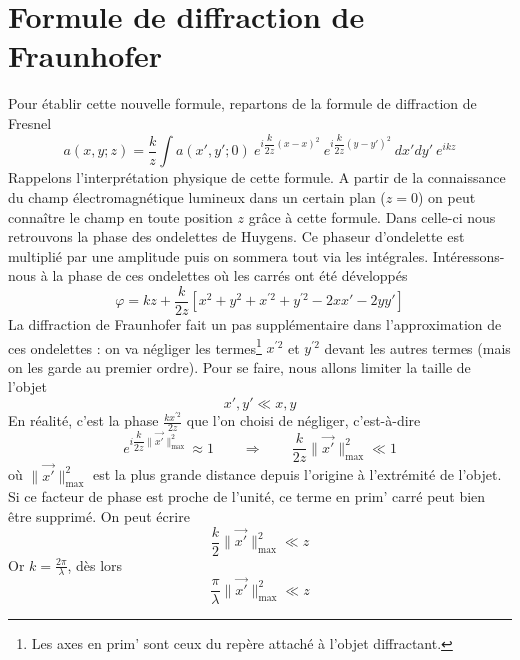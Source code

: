 \newpage
\section{Formule de diffraction de Fraunhofer}
Pour établir cette nouvelle formule, repartons de la formule de diffraction de Fresnel
\begin{equation}
a(x,y;z) = \frac{k}{z}\int a(x',y';0)\ e^{i\dfrac{k}{2z}(x-x)^2}\
 e^{i\dfrac{k}{2z}(y-y')^2}\ dx'dy'\  e^{ikz}
\end{equation}
Rappelons l'interprétation physique de cette formule.
A partir de la connaissance du champ électromagnétique lumineux dans un certain plan 
($z=0$) on peut connaître le champ en toute position $z$ grâce à cette formule. Dans 
celle-ci nous retrouvons la phase des ondelettes de Huygens. Ce phaseur d'ondelette 
est multiplié par une amplitude puis on sommera tout via les intégrales. Intéressons-
nous à la phase de ces ondelettes où les carrés ont été développés
\begin{equation}
\varphi = kz + \frac{k}{2z}\left[x^2 + y^2 + x^{'2} + y^{'2} - 2xx'-2yy'\right]
\end{equation}
La diffraction de Fraunhofer fait un pas supplémentaire dans l'approximation de ces 
ondelettes : on va négliger les termes\footnote{Les axes en prim' sont ceux du repère 
attaché à l'objet diffractant.} $x^{'2}$ et $y^{'2}$ devant les autres termes (mais on les garde au premier 
ordre). Pour se faire, nous allons limiter la taille de l'objet
\begin{equation}
x',y' \ll x,y
\end{equation}
En réalité, c'est la phase $\frac{kx^{'2}}{2z}$ que l'on choisi de négliger, c'est-à-dire
\begin{equation}
e^{i\dfrac{k}{2z}\|\vec{x'}\|^2_{\max}} \approx 1\qquad\Rightarrow\qquad \dfrac{k}{2z}\|
\vec{x'}\|^2_{\max}\ll 1
\end{equation}
où $\|\vec{x'}\|^2_{\max}$ est la plus grande distance depuis l'origine à l'extrémité 
de l'objet. Si ce facteur de phase est proche de l'unité, ce terme en prim' carré peut 
bien être supprimé. On peut écrire
\begin{equation}
\dfrac{k}{2}\|\vec{x'}\|^2_{\max} \ll z
\end{equation}
Or $k = \frac{2\pi}{\lambda}$, dès lors
\begin{equation}
\dfrac{\pi}{\lambda}\|\vec{x'}\|^2_{\max} \ll z
\end{equation}

